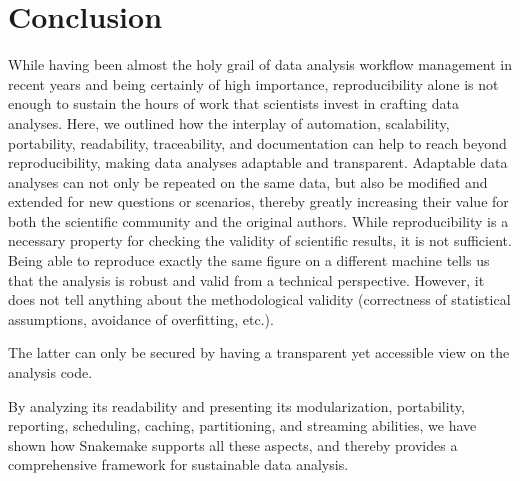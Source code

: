 \documentclass[parskip=half]{scrartcl}
\begin{document}
\section{Conclusion}

While having been almost the holy grail of data analysis workflow management in recent years and being certainly of high importance, reproducibility alone is not enough to sustain the hours of work that scientists invest in crafting data analyses.
Here, we outlined how the interplay of automation, scalability, portability, readability, traceability, and documentation can help to reach beyond reproducibility, making data analyses adaptable and transparent.
Adaptable data analyses can not only be repeated on the same data, but also be modified and extended for new questions or scenarios, thereby greatly increasing their value for both the scientific community and the original authors.
While reproducibility is a necessary property for checking the validity of scientific results, it is not sufficient.
Being able to reproduce exactly the same figure on a different machine tells us that the analysis is robust and valid from a technical perspective.
However, it does not tell anything about the methodological validity (correctness of statistical assumptions, avoidance of overfitting, etc.).

The latter can only be secured by having a transparent yet accessible view on the analysis code.

By analyzing its readability and presenting its modularization, portability, reporting, scheduling, caching, partitioning, and streaming abilities, we have shown how Snakemake supports all these aspects, and thereby provides a comprehensive framework for sustainable data analysis.
\end{document}
